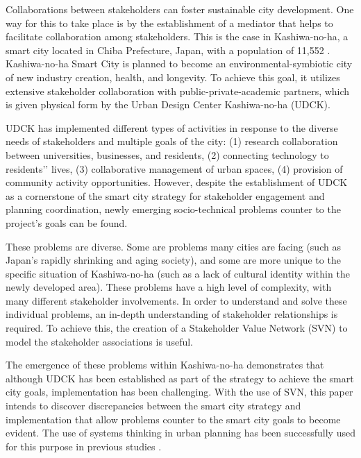 \documentclass[conference]{IEEEtran}
\begin{document}
Collaborations between stakeholders can foster sustainable city development. One way for this to take place is by the establishment of a mediator that helps to facilitate collaboration among stakeholders. This is the case in Kashiwa-no-ha, a smart city located in Chiba Prefecture, Japan, with a population of 11,552 \cite{kashiwa}. Kashiwa-no-ha Smart City is planned to become an environmental-symbiotic city of new industry creation, health, and longevity. To achieve this goal, it utilizes extensive stakeholder collaboration with public-private-academic partners, which is given physical form by the Urban Design Center Kashiwa-no-ha (UDCK).

UDCK has implemented different types of activities in response to the diverse needs of stakeholders and multiple goals of the city: (1) research collaboration between universities, businesses, and residents, (2) connecting technology to residents’' lives, (3) collaborative management of urban spaces, (4) provision of community activity opportunities. However, despite the establishment of UDCK as a cornerstone of the smart city strategy for stakeholder engagement and planning coordination, newly emerging socio-technical problems counter to the project’s goals can be found.

These problems are diverse. Some are problems many cities are facing (such as Japan's rapidly shrinking and aging society), and some are more unique to the specific situation of Kashiwa-no-ha (such as a lack of cultural identity within the newly developed area). These problems have a high level of complexity, with many different stakeholder involvements. In order to understand and solve these individual problems, an in-depth understanding of stakeholder relationships is required. To achieve this, the creation of a Stakeholder Value Network (SVN) to model the stakeholder associations is useful.

The emergence of these problems within Kashiwa-no-ha demonstrates that although UDCK has been established as part of the strategy to achieve the smart city goals, implementation has been challenging. With the use of SVN, this paper intends to discover discrepancies between the smart city strategy and implementation that allow problems counter to the smart city goals to become evident. The use of systems thinking in urban planning has been successfully used for this purpose in previous studies \citep{mino2016philosophy,webb2018sustainable,street2015cost}.


\end{document}
